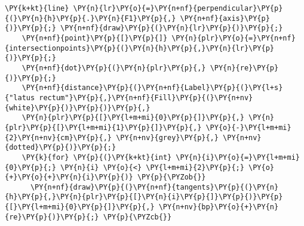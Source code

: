 \begin{Verbatim}[commandchars=\\\{\}]
    \PY{k+kt}{line} \PY{n}{lr}\PY{o}{=}\PY{n+nf}{perpendicular}\PY{p}{(}\PY{n}{h}\PY{p}{.}\PY{n}{F1}\PY{p}{,} \PY{n+nf}{axis}\PY{p}{)}\PY{p}{;} \PY{n+nf}{draw}\PY{p}{(}\PY{n}{lr}\PY{p}{)}\PY{p}{;}
    \PY{n+nf}{point}\PY{p}{[}\PY{p}{]} \PY{n}{plr}\PY{o}{=}\PY{n+nf}{intersectionpoints}\PY{p}{(}\PY{n}{h}\PY{p}{,}\PY{n}{lr}\PY{p}{)}\PY{p}{;}
    \PY{n+nf}{dot}\PY{p}{(}\PY{n}{plr}\PY{p}{,} \PY{n}{re}\PY{p}{)}\PY{p}{;}
    \PY{n+nf}{distance}\PY{p}{(}\PY{n+nf}{Label}\PY{p}{(}\PY{l+s}{"latus rectum"}\PY{p}{,}\PY{n+nf}{Fill}\PY{p}{(}\PY{n+nv}{white}\PY{p}{)}\PY{p}{)}\PY{p}{,}
    \PY{n}{plr}\PY{p}{[}\PY{l+m+mi}{0}\PY{p}{]}\PY{p}{,} \PY{n}{plr}\PY{p}{[}\PY{l+m+mi}{1}\PY{p}{]}\PY{p}{,} \PY{o}{-}\PY{l+m+mi}{2}\PY{n+nv}{cm}\PY{p}{,} \PY{n+nv}{grey}\PY{p}{,} \PY{n+nv}{dotted}\PY{p}{)}\PY{p}{;}
    \PY{k}{for} \PY{p}{(}\PY{k+kt}{int} \PY{n}{i}\PY{o}{=}\PY{l+m+mi}{0}\PY{p}{;} \PY{n}{i} \PY{o}{<} \PY{l+m+mi}{2}\PY{p}{;} \PY{o}{+}\PY{o}{+}\PY{n}{i}\PY{p}{)} \PY{p}{\PYZob{}}
      \PY{n+nf}{draw}\PY{p}{(}\PY{n+nf}{tangents}\PY{p}{(}\PY{n}{h}\PY{p}{,}\PY{n}{plr}\PY{p}{[}\PY{n}{i}\PY{p}{]}\PY{p}{)}\PY{p}{[}\PY{l+m+mi}{0}\PY{p}{]}\PY{p}{,} \PY{n+nv}{bp}\PY{o}{+}\PY{n}{re}\PY{p}{)}\PY{p}{;} \PY{p}{\PYZcb{}}
\end{Verbatim}
